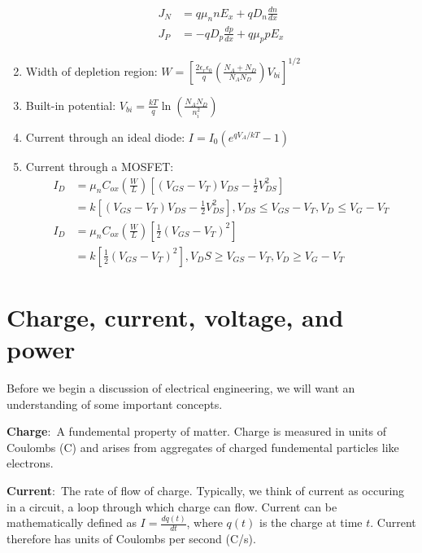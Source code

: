 \documentclass[nobib]{tufte-handout}
\newcommand{\defn}[2]{\noindent\textbf{#1}:\ #2}
\begin{document}
\begin{enumerate}
    \begin{align*}
        J_N &= q\mu_n n E_x + qD_n \frac{dn}{dx} \\
        J_P &= -qD_p \frac{dp}{dx} + q\mu_p p E_x
    \end{align*}
    \item Width of depletion region: $W = \left[\frac{2\epsilon_r \epsilon_0}{q} \left(\frac{N_A + N_D}{N_A N_D}\right) V_{bi}\right]^{1/2}$
    \item Built-in potential: $V_{bi} = \frac{kT}{q}\ln{\left(\frac{N_AN_D}{n_i^2}\right)}$
    \item Current through an ideal diode: $I = I_0(e^{qV_A / kT} - 1)$
    \item Current through a MOSFET: 
    \begin{align*}
        I_D &= \mu_n C_{ox} \left(\frac{W}{L}\right) \left[(V_{GS} - V_T)V_{DS} - \frac{1}{2} V_{DS}^2\right] \\
        &= k\left[(V_{GS} - V_T)V_{DS} - \frac{1}{2} V_{DS}^2\right], V_{DS} \leq V_{GS} - V_T, V_D \leq V_G - V_T \\
        I_D &= \mu_n C_{ox} \left(\frac{W}{L}\right) \left[\frac{1}{2} (V_{GS}-V_T)^2\right] \\
        &= k \left[\frac{1}{2} (V_{GS}-V_T)^2\right], V_DS \geq V_{GS} - V_T, V_D \geq V_G - V_T
    \end{align*}
    
\end{enumerate}

\pagebreak 

\section{Charge, current, voltage, and power}
Before we begin a discussion
of electrical engineering, we will want an
understanding of some important concepts. 

\defn{Charge}{A fundemental property of matter.} Charge
is measured in units of Coulombs (C) and 
arises from aggregates of charged 
fundemental particles like electrons.

\defn{Current}{The rate of flow of charge.} Typically,
we think of current as occuring in a circuit, a loop
through which charge can flow. Current can
be mathematically defined as $I = \frac{dq(t)}{dt}$, where 
$q(t)$ is the charge at time $t$. Current therefore has units
of Coulombs per second (C/s). 
\end{document}
